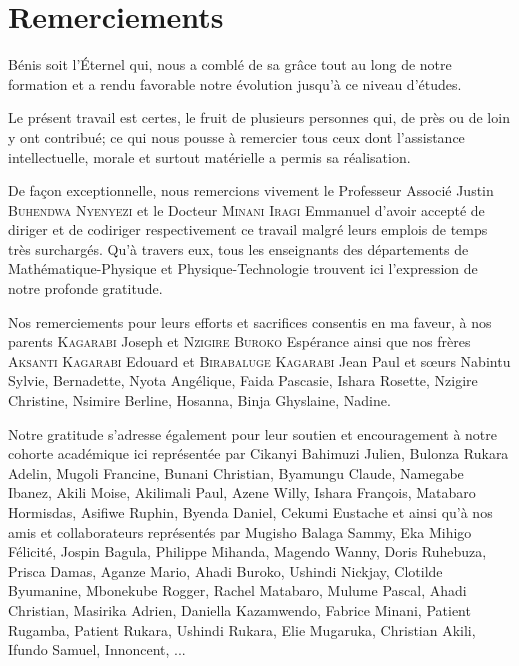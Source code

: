 \documentclass[11pt,a4paper,oneside]{book}
\begin{document}
\chapter*{Remerciements}
Bénis soit l'Éternel qui, nous a comblé de sa grâce tout au long de notre
formation et a rendu favorable notre évolution jusqu'à ce niveau d'études.\\
\par Le présent travail est certes, le fruit de plusieurs personnes qui, de près ou de
loin y ont contribué; ce qui nous pousse à remercier tous ceux dont l’assistance
intellectuelle, morale et surtout matérielle a permis sa réalisation.\\
\par De façon exceptionnelle, nous remercions vivement le Professeur Associé Justin \textsc{Buhendwa
Nyenyezi} et le Docteur \textsc{Minani Iragi} Emmanuel d'avoir accepté de diriger et de codiriger respectivement ce travail malgré leurs emplois de temps très surchargés.
Qu’à travers eux, tous les enseignants des départements de Mathématique-Physique
et Physique-Technologie trouvent ici l’expression de notre profonde gratitude.\\
\par Nos remerciements pour leurs efforts et
sacrifices consentis en ma faveur, à nos parents \textsc{Kagarabi}
Joseph et \textsc{Nzigire Buroko} Espérance ainsi que nos frères \textsc{Aksanti
Kagarabi} Edouard et \textsc{Birabaluge Kagarabi} Jean Paul et sœurs Nabintu Sylvie,
Bernadette, Nyota Angélique, Faida  Pascasie,
Ishara Rosette, Nzigire  Christine, Nsimire 
Berline, Hosanna, Binja Ghyslaine, Nadine.\\
\par Notre gratitude s'adresse également pour leur soutien et encouragement à notre cohorte académique ici représentée par Cikanyi Bahimuzi Julien, Bulonza Rukara Adelin, Mugoli Francine, Bunani Christian, Byamungu Claude, Namegabe Ibanez, Akili Moise, Akilimali Paul, Azene
Willy, Ishara François, Matabaro Hormisdas,
Asifiwe Ruphin, Byenda Daniel, Cekumi  Eustache et ainsi qu'à nos amis et collaborateurs représentés par Mugisho
Balaga Sammy, Eka Mihigo Félicité, Jospin Bagula, Philippe Mihanda, Magendo Wanny, Doris Ruhebuza, Prisca Damas, Aganze Mario, Ahadi Buroko, Ushindi Nickjay, Clotilde Byumanine, Mbonekube
Rogger, Rachel Matabaro, Mulume Pascal, Ahadi Christian, Masirika Adrien, Daniella Kazamwendo, Fabrice Minani, Patient Rugamba, Patient Rukara, Ushindi Rukara, Elie Mugaruka, Christian Akili, Ifundo Samuel, Innoncent, ...\\
\end{document}
